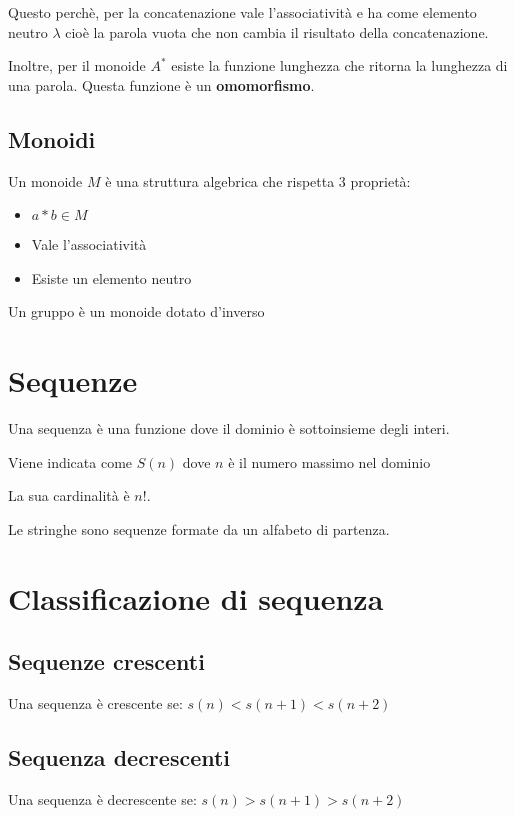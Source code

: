 \documentclass[a4paper]{article}
\begin{document}
Questo perchè, per la concatenazione vale l'associatività e ha come elemento neutro $\lambda$ cioè la parola vuota che non cambia il risultato della concatenazione.

Inoltre, per il monoide $A^*$ esiste la funzione lunghezza che ritorna la lunghezza di una parola. Questa funzione è un \textbf{omomorfismo}.

\subsection{Monoidi}

Un monoide $M$ è una struttura algebrica che rispetta 3 proprietà:

\begin{itemize}
	\item $ a * b \in M $
	\item Vale l'associatività
	\item Esiste un elemento neutro
\end{itemize}

Un gruppo è un monoide dotato d'inverso

\section{Sequenze}

Una sequenza è una funzione dove il dominio è sottoinsieme degli interi.

Viene indicata come $S(n)$ dove $n$ è il numero massimo nel dominio

La sua cardinalità è $n!$.

Le stringhe sono sequenze formate da un alfabeto di partenza.
\section{Classificazione di sequenza}

\subsection{Sequenze crescenti}

Una sequenza è crescente se: $s(n) < s(n+1) < s(n+2)$

\subsection{Sequenza decrescenti}

Una sequenza è decrescente se: $s(n) > s(n+1) > s(n+2)$
\end{document}
